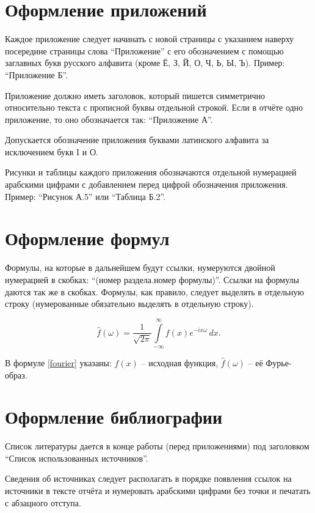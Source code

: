 \documentclass[utf8,12pt, coursreport]{G7-32}
\begin{document}
\section{Оформление приложений}

Каждое приложение следует начинать с новой страницы с указанием наверху посередине страницы слова ``Приложение'' с его обозначением с помощью заглавных букв русского алфавита (кроме Ё, З, Й, О, Ч, Ь, Ы, Ъ). Пример: ``Приложение Б''.

Приложение должно иметь заголовок, который пишется симметрично относительно текста с прописной буквы отдельной строкой. Если в отчёте одно приложение, то оно обозначается так: ``Приложение А''.

Допускается обозначение приложения буквами латинского алфавита за исключением букв I и О.

Рисунки и таблицы каждого приложения обозначаются отдельной нумерацией арабскими цифрами с добавлением перед цифрой обозначения приложения. Пример: ``Рисунок А.5'' или ``Таблица Б.2''.

\section{Оформление формул}

Формулы, на которые в дальнейшем будут ссылки, нумеруются двойной нумерацией в скобках: ``(номер раздела.номер формулы)''. Ссылки на формулы даются так же в скобках. Формулы, как правило, следует выделять в отдельную строку (нумерованные обязательно выделять в отдельную строку).

\begin{equation}\label{fourier}
\hat{f}(\omega)=\frac{1}{\sqrt{2\pi}}\int\limits_{-\infty}^{\infty}f(x)e^{-ix\omega}\,dx.
\end{equation}

В формуле \eqref{fourier} указаны: $f(x)$ -- исходная функция, $\hat{f}(\omega)$ -- её Фурье-образ.

\section{Оформление библиографии}

Список литературы дается в конце работы (перед приложениями) под заголовком ``Список использованных источников''.

Сведения об источниках следует располагать в порядке появления ссылок на источники в тексте отчёта и нумеровать арабскими цифрами без точки и печатать с абзацного отступа.
\end{document}
